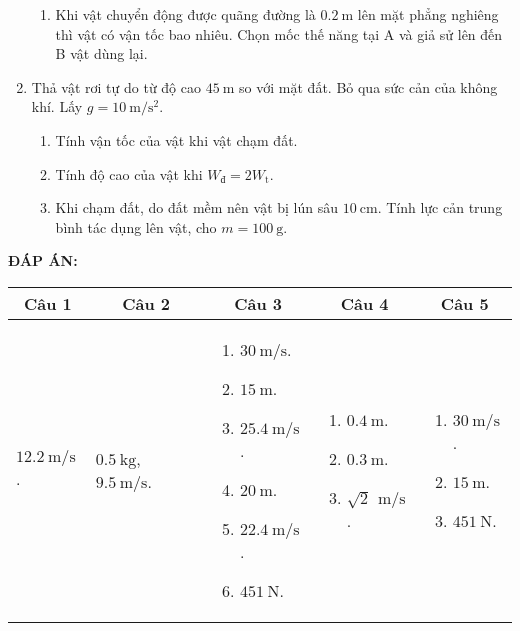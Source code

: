 \begin{enumerate}
\begin{enumerate}[label=\alph*)]
		\item Khi vật chuyển động được quãng đường là $\SI{0,2}{\meter}$ lên mặt phẳng nghiêng thì vật có vận tốc bao nhiêu. Chọn mốc thế năng tại A và giả sử lên đến B vật dùng lại.
	\end{enumerate}
	\item %
	Thả vật rơi tự do từ độ cao $\SI{45}{\meter}$ so với mặt đất. Bỏ qua sức cản của không khí. Lấy $g= \SI{10}{\meter/\second^2}$.
	\begin{enumerate}[label=\alph*)]
		\item Tính vận tốc của vật khi vật chạm đất.
		\item Tính độ cao của vật khi $W_\text{đ}=2W_\text{t}$.
		\item Khi chạm đất, do đất mềm nên vật bị lún sâu $\SI{10}{\centi\meter}$. Tính lực cản trung bình tác dụng lên vật, cho $m=\SI{100}{\gram}$.
	\end{enumerate}		
\end{enumerate}

\textbf{ĐÁP ÁN:}

\begin{longtable}[\textwidth]{|m{}|m{}|m{}|m{}|m{}|}
	\hline%
	\multicolumn{1}{|c}{\textbf{Câu 1}} &
	\multicolumn{1}{|c|}{\textbf{Câu 2}}& 
	\multicolumn{1}{c|}{\textbf{Câu 3}} &
	\multicolumn{1}{c|}{\textbf{Câu 4}} &
	\multicolumn{1}{c|}{\textbf{Câu 5}}  \\
	\hline
	$\SI{12,2}{\meter/\second}$. &
	$\SI{0,5}{\kilogram}$, $\SI{9,5}{\meter/\second}$. &
	\begin{enumerate}[label=\alph*)]
		\item $\SI{30}{\meter/\second}$.
		\item $\SI{15}{\meter}$.
		\item $\SI{25,4}{\meter/\second}$.
		\item $\SI{20}{\meter}$.
		\item $\SI{22,4}{\meter/\second}$.
		\item $\SI{451}{\newton}$.
	\end{enumerate} &
	\begin{enumerate}[label=\alph*)]
		\item $\SI{0,4}{\meter}$.
		\item $\SI{0,3}{\meter}$.
		\item $\sqrt{2}\,\SI{}{\meter/\second}$.
	\end{enumerate} &
	\begin{enumerate}[label=\alph*)]
		\item $\SI{30}{\meter/\second}$.
		\item $\SI{15}{\meter}$.
		\item $\SI{451}{\newton}$.
	\end{enumerate}\\
	\hline
\end{longtable}


